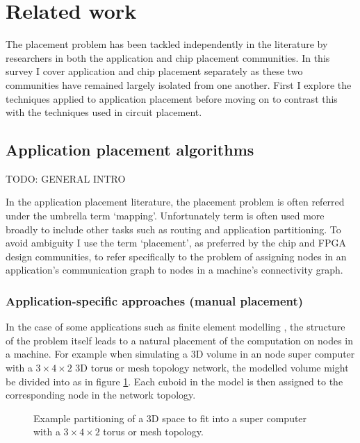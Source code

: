 	\section{Related work}
		
		The placement problem has been tackled independently in the literature by
		researchers in both the application and chip placement communities. In this
		survey I cover application and chip placement separately as these two
		communities have remained largely isolated from one another. First I
		explore the techniques applied to application placement before moving on to
		contrast this with the techniques used in circuit placement.
		
		\subsection{Application placement algorithms}
			
			TODO: GENERAL INTRO
			
			In the application placement literature, the placement problem is often
			referred under the umbrella term `mapping'. Unfortunately term is often
			used more broadly to include other tasks such as routing and application
			partitioning. To avoid ambiguity I use the term `placement', as preferred
			by the chip and FPGA design communities, to refer specifically to the
			problem of assigning nodes in an application's communication graph to nodes
			in a machine's connectivity graph.
			
			\subsubsection{Application-specific approaches (manual placement)}
				
				In the case of some applications such as finite element modelling
				\cite{bermejo13}, the structure of the problem itself leads to a
				natural placement of the computation on nodes in a machine. For example
				when simulating a 3D volume in an node super computer with a $3 \times
				4 \times 2$ 3D torus or mesh topology network, the modelled volume
				might be divided into as in figure \ref{fig:fem-partitioning}. Each
				cuboid in the model is then assigned to the corresponding node in the
				network topology.
				
				\begin{figure}
					\center
					
					\caption{Example partitioning of a 3D space to fit into a super
					computer with a $3\times4\times2$ torus or mesh topology.}
					\label{fig:fem-partitioning}
				\end{figure}
				
